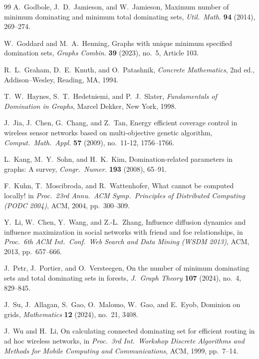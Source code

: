 \documentclass[11pt]{article}
\theoremstyle{definition}
\theoremstyle{remark}
\begin{document}
\begin{thebibliography}{99}
A.~Godbole, J.~D.~Jamieson, and W.~Jamieson,
Maximum number of minimum dominating and minimum total dominating sets,
\emph{Util.~Math.} \textbf{94} (2014), 269--274.

W.~Goddard and M.~A.~Henning,
Graphs with unique minimum specified domination sets,
\emph{Graphs Combin.} \textbf{39} (2023), no.~5, Article 103.

R.~L.~Graham, D.~E.~Knuth, and O.~Patashnik,
\emph{Concrete Mathematics}, 2nd ed.,
Addison--Wesley, Reading, MA, 1994.


T.~W.~Haynes, S.~T.~Hedetniemi, and P.~J.~Slater,
\emph{Fundamentals of Domination in Graphs},
Marcel Dekker, New York, 1998.

J.~Jia, J.~Chen, G.~Chang, and Z.~Tan,
Energy efficient coverage control in wireless sensor networks based on multi-objective genetic algorithm,
\emph{Comput.~Math.~Appl.} \textbf{57} (2009), no.~11-12, 1756--1766.

L.~Kang, M.~Y.~Sohn, and H.~K.~Kim,
Domination-related parameters in graphs: A survey,
\emph{Congr.~Numer.} \textbf{193} (2008), 65--91.

F.~Kuhn, T.~Moscibroda, and R.~Wattenhofer,
What cannot be computed locally!
in \emph{Proc.~23rd Annu.~ACM Symp.~Principles of Distributed Computing (PODC 2004)},
ACM, 2004, pp.~300--309.

Y.~Li, W.~Chen, Y.~Wang, and Z.-L.~Zhang,
Influence diffusion dynamics and influence maximization in social networks with friend and foe relationships,
in \emph{Proc.~6th ACM Int.~Conf.~Web Search and Data Mining (WSDM 2013)},
ACM, 2013, pp.~657--666.

J.~Petr, J.~Portier, and O.~Versteegen,
On the number of minimum dominating sets and total dominating sets in forests,
\emph{J.~Graph Theory} \textbf{107} (2024), no.~4, 829--845.

J.~Su, J.~Allagan, S.~Gao, O.~Malomo, W.~Gao, and E.~Eyob,
Dominion on grids,
\emph{Mathematics} \textbf{12} (2024), no.~21, 3408.

J.~Wu and H.~Li,
On calculating connected dominating set for efficient routing in ad hoc wireless networks,
in \emph{Proc.~3rd Int.~Workshop Discrete Algorithms and Methods for Mobile Computing and Communications},
ACM, 1999, pp.~7--14.

\end{thebibliography}
\end{document}
